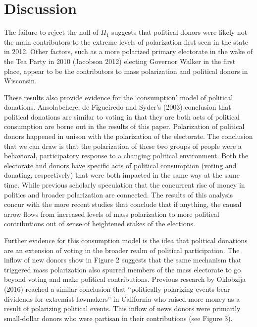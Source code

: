 \documentclass[12pt,]{article}
\begin{document}
\hypertarget{discussion}{%
\section{Discussion}\label{discussion}}

The failure to reject the null of \(H_{1}\) suggests that political
donors were likely not the main contributors to the extreme levels of
polarization first seen in the state in 2012. Other factors, such as a
more polarized primary electorate in the wake of the Tea Party in 2010
(Jacobson 2012) electing Governor Walker in the first place, appear to
be the contributors to mass polarization and political donors in
Wisconsin.

These results also provide evidence for the `consumption' model of
political donations. Ansolabehere, de Figueiredo and Syder's (2003)
conclusion that political donations are similar to voting in that they
are both acts of political consumption are borne out in the results of
this paper. Polarization of political donors happened in unison with the
polarization of the electorate. The conclusion that we can draw is that
the polarization of these two groups of people were a behavioral,
participatory response to a changing political environment. Both the
electorate and donors have specific acts of political consumption
(voting and donating, respectively) that were both impacted in the same
way at the same time. While previous scholarly speculation that the
concurrent rise of money in politics and broader polarization are
connected. The results of this analysis concur with the more recent
studies that conclude that if anything, the causal arrow flows from
increased levels of mass polarization to more political contributions
out of sense of heightened stakes of the elections.

Further evidence for this consumption model is the idea that political
donations are an extension of voting in the broader realm of political
participation. The inflow of new donors show in Figure 2 suggests that
the same mechanism that triggered mass polarization also spurred members
of the mass electorate to go beyond voting and make political
contributions. Previous research by Oklobzija (2016) reached a similar
conclusion that ``politically polarizing events bear dividends for
extremist lawmakers'' in California who raised more money as a result of
polarizing political events. This inflow of news donors were primarily
small-dollar donors who were partisan in their contributions (see Figure
3).
\end{document}
